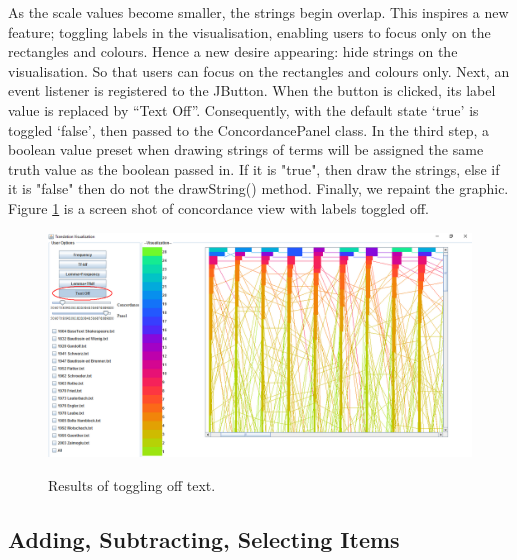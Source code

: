 As the scale values become smaller, the strings begin overlap. This inspires a new feature; toggling labels in the visualisation, enabling users to focus only on the rectangles and colours. Hence a new desire appearing: hide strings on the visualisation. So that users can focus on the rectangles and colours only. Next, an event listener is registered to the JButton. When the button is clicked, its label value is replaced by “Text Off”. Consequently, with the default state ‘true’ is toggled ‘false’, then passed to the ConcordancePanel class. In the third step, a boolean value preset when drawing strings of terms will be assigned the same truth value as the boolean passed in. If it is "true", then draw the strings, else if it is "false" then do not the drawString() method. Finally, we repaint the graphic. Figure \ref{fig:textOnOff} is a screen shot of concordance view with labels toggled off.

\begin{figure}[H]
	\centering	
	\includegraphics[scale=0.5]{Figs/Text-On-Off}\\[1ex]
	\caption{Results of toggling off text.}
	\label{fig:textOnOff}
\end{figure} 

\subsection{Adding, Subtracting, Selecting Items}

